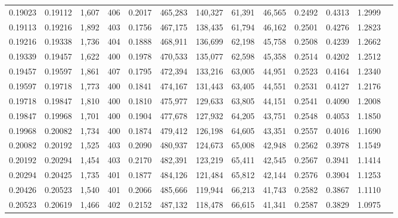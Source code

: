 \begin{tabular}{rrrrrrrrrrrrr}
0.19023 & 0.19112 & 1,607 & 406 &                                     0.2017 & 465,283 & 140,327 &  61,391 &  46,565 & 0.2492 & 0.4313 & 1.2999 \\
0.19113 & 0.19216 & 1,892 & 403 &                                     0.1756 & 467,175 & 138,435 &  61,794 &  46,162 & 0.2501 & 0.4276 & 1.2823 \\
0.19216 & 0.19338 & 1,736 & 404 &                                     0.1888 & 468,911 & 136,699 &  62,198 &  45,758 & 0.2508 & 0.4239 & 1.2662 \\
0.19339 & 0.19457 & 1,622 & 400 &                                     0.1978 & 470,533 & 135,077 &  62,598 &  45,358 & 0.2514 & 0.4202 & 1.2512 \\
0.19457 & 0.19597 & 1,861 & 407 &                                     0.1795 & 472,394 & 133,216 &  63,005 &  44,951 & 0.2523 & 0.4164 & 1.2340 \\
0.19597 & 0.19718 & 1,773 & 400 &                                     0.1841 & 474,167 & 131,443 &  63,405 &  44,551 & 0.2531 & 0.4127 & 1.2176 \\
0.19718 & 0.19847 & 1,810 & 400 &                                     0.1810 & 475,977 & 129,633 &  63,805 &  44,151 & 0.2541 & 0.4090 & 1.2008 \\
0.19847 & 0.19968 & 1,701 & 400 &                                     0.1904 & 477,678 & 127,932 &  64,205 &  43,751 & 0.2548 & 0.4053 & 1.1850 \\
0.19968 & 0.20082 & 1,734 & 400 &                                     0.1874 & 479,412 & 126,198 &  64,605 &  43,351 & 0.2557 & 0.4016 & 1.1690 \\
0.20082 & 0.20192 & 1,525 & 403 &                                     0.2090 & 480,937 & 124,673 &  65,008 &  42,948 & 0.2562 & 0.3978 & 1.1549 \\
0.20192 & 0.20294 & 1,454 & 403 &                                     0.2170 & 482,391 & 123,219 &  65,411 &  42,545 & 0.2567 & 0.3941 & 1.1414 \\
0.20294 & 0.20425 & 1,735 & 401 &                                     0.1877 & 484,126 & 121,484 &  65,812 &  42,144 & 0.2576 & 0.3904 & 1.1253 \\
0.20426 & 0.20523 & 1,540 & 401 &                                     0.2066 & 485,666 & 119,944 &  66,213 &  41,743 & 0.2582 & 0.3867 & 1.1110 \\
0.20523 & 0.20619 & 1,466 & 402 &                                     0.2152 & 487,132 & 118,478 &  66,615 &  41,341 & 0.2587 & 0.3829 & 1.0975 \\

\end{tabular}
